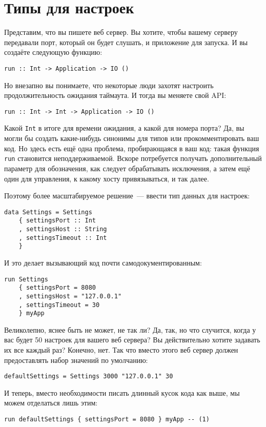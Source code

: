 \chapter{Типы для настроек} \label{chap:settings_types}
Представим, что вы пишете веб сервер. Вы хотите, чтобы вашему серверу
передавали порт, который он будет слушать, и приложение для запуска. И вы
создаёте следующую функцию:
\begin{lstlisting}
run :: Int -> Application -> IO ()
\end{lstlisting}

Но внезапно вы понимаете, что некоторые люди захотят настроить
продолжительность ожидания таймаута. И тогда вы меняете свой API:
\begin{lstlisting}
run :: Int -> Int -> Application -> IO ()
\end{lstlisting}

Какой \lstinline!Int! в итоге для времени ожидания, а какой для
номера порта? Да, вы могли бы создать какие-нибудь синонимы для типов
или прокомментировать ваш код. Но здесь есть ещё одна проблема,
пробирающаяся в ваш код: такая функция \lstinline!run! становится
неподдерживаемой. Вскоре потребуется получать дополнительный параметр
для обозначения, как следует обрабатывать исключения, а затем ещё один
для управления, к какому хосту привязываться, и так далее.

Поэтому более масштабируемое решение~--- ввести тип данных для
настроек:
\begin{lstlisting}
data Settings = Settings
    { settingsPort :: Int
    , settingsHost :: String
    , settingsTimeout :: Int
    }
\end{lstlisting}
И это делает вызывающий код почти самодокументированным:
\begin{lstlisting}
run Settings
    { settingsPort = 8080
    , settingsHost = "127.0.0.1"
    , settingsTimeout = 30
    } myApp
\end{lstlisting}

Великолепно, яснее быть не может, не так ли? Да, так, но что случится, когда у вас
будет 50 настроек для вашего веб сервера? Вы действительно хотите
задавать их все каждый раз? Конечно, нет. Так что вместо этого веб
сервер должен предоставлять набор значений по умолчанию:
\begin{lstlisting}
defaultSettings = Settings 3000 "127.0.0.1" 30
\end{lstlisting}
И теперь, вместо необходимости писать длинный кусок кода как выше,
мы можем отделаться лишь этим:
\begin{lstlisting}
run defaultSettings { settingsPort = 8080 } myApp -- (1)
\end{lstlisting}

